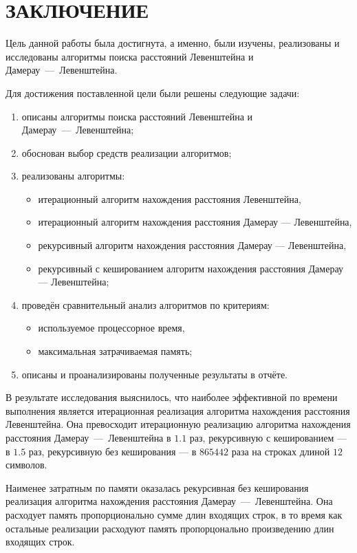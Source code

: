 \section*{ЗАКЛЮЧЕНИЕ}

Цель данной работы была достигнута, а именно, были изучены, реализованы и исследованы алгоритмы поиска расстояний Левенштейна и Дамерау~---~Левенштейна.

Для достижения поставленной цели были решены следующие задачи:
\begin{enumerate}
    \item описаны алгоритмы поиска расстояний Левенштейна и Дамерау~---~Левенштейна;
    \item обоснован выбор средств реализации алгоритмов;
    \item реализованы алгоритмы:
        \begin{itemize}[leftmargin=*]
            \item итерационный алгоритм нахождения расстояния Левенштейна,
            \item итерационный алгоритм нахождения расстояния Дамерау --- Левенштейна,
            \item рекурсивный алгоритм нахождения расстояния Дамерау --- Левенштейна,
            \item рекурсивный с кешированием алгоритм нахождения расстояния Дамерау --- Левенштейна;
        \end{itemize}
    \item проведён сравнительный анализ алгоритмов по критериям:
        \begin{itemize}[leftmargin=*]
            \item используемое процессорное время,
            \item максимальная затрачиваемая память;
        \end{itemize}
    \item описаны и проанализированы полученные результаты в отчёте.
\end{enumerate}

В результате исследования выяснилось, что наиболее эффективной по времени выполнения является итерационная реализация алгоритма нахождения расстояния Левенштейна.
Она превосходит итерационную реализацию алгоритма нахождения расстояния Дамерау~---~Левенштейна в $1.1$ раз, рекурсивную с кешированием --- в $1.5$ раз, рекурсивную без кеширования --- в $865442$ раза на строках длиной $12$ символов.

Наименее затратным по памяти оказалась рекурсивная без кеширования реализация алгоритма нахождения расстояния Дамерау~---~Левенштейна.
Она расходует память пропорционально сумме длин входящих строк, в то время как остальные реализации расходуют память пропорцонально произведению длин входящих строк.
